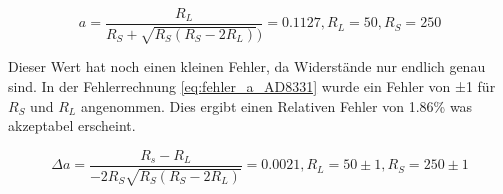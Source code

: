 \begin{equation}
    a = \frac{R_L}{R_S + \sqrt{R_S(R_S - 2R_L)})} = 0.1127, R_L =50, R_S = 250
    \label{eq:a_AD8331}
\end{equation}

Dieser Wert hat noch einen kleinen Fehler, da Widerstände nur endlich genau sind. In der Fehlerrechnung \ref{eq:fehler_a_AD8331} wurde ein Fehler von ±1 für $R_S$ und $R_L$ angenommen. Dies ergibt einen Relativen Fehler von 1.86\% was akzeptabel erscheint.

\begin{equation}
    \Delta a = \frac{R_s - R_L}{-2R_S\sqrt{R_S(R_S - 2R_L)}} = 0.0021, R_L = 50±1, R_S = 250±1
    \label{eq:a_AD8331}
\end{equation}

